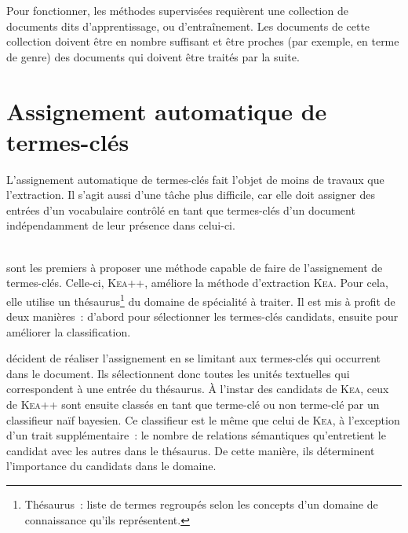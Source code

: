         Pour fonctionner, les méthodes supervisées requièrent une collection de
        documents dits \og{}d'apprentissage\fg{}, ou \og{}d'entraînement\fg{}.
        Les documents de cette collection doivent être en nombre suffisant et
        être proches (par exemple, en terme de genre) des documents qui doivent
        être traités par la suite.

  \section{Assignement automatique de termes-clés}
  \label{sec:main-state_of_the_art-automatic_keyphrase_assignment}
    L'assignement automatique de termes-clés fait l'objet de moins de travaux
    que l'extraction. Il s'agit aussi d'une tâche plus difficile, car elle doit
    assigner des entrées d'un vocabulaire contrôlé en tant que termes-clés d'un
    document indépendamment de leur présence dans celui-ci.

    ~\\ sont les premiers à proposer une
    méthode capable de faire de l'assignement de termes-clés. Celle-ci,
    \textsc{Kea}++, améliore la méthode d'extraction \textsc{Kea}. Pour cela,
    elle utilise un thésaurus\footnote{Thésaurus~: liste de termes regroupés
    selon les concepts d'un domaine de connaissance qu'ils représentent.} du
    domaine de spécialité à traiter. Il est mis à profit de deux manières~:
    d'abord pour sélectionner les termes-clés candidats, ensuite pour améliorer
    la classification.

     décident de réaliser l'assignement en se
    limitant aux termes-clés qui occurrent dans le document. Ils sélectionnent
    donc toutes les unités textuelles qui correspondent à une entrée du
    thésaurus. À l'instar des candidats de \textsc{Kea}, ceux de \textsc{Kea++}
    sont ensuite classés en tant que \og{}terme-clé\fg{} ou \og{}non
    terme-clé\fg{} par un classifieur naïf bayesien. Ce classifieur est le même
    que celui de \textsc{Kea}, à l'exception d'un trait supplémentaire~: le
    nombre de relations sémantiques qu'entretient le candidat avec les autres
    dans le thésaurus. De cette manière, ils déterminent l'importance du
    candidats dans le domaine.

